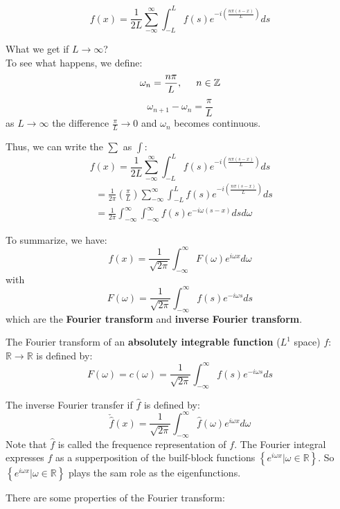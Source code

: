 \documentclass[12pt]{article} %
\begin{document}
$$f(x) = \frac{1}{2L} \sum_{-\infty}^{\infty} \int_{-L}^{L} f(s)e^{-i(\frac{n\pi (s-x)}{L})}ds$$\par
What we get if  $L \to \infty$?\\ 
To see what happens, we define:
$$
\omega_{n} = \frac{n\pi}{L}, \hspace{5mm} n \in \mathbb{Z}
$$
$$
\omega_{n+1}-\omega_{n}=\frac{\pi}{L}
$$as $L \to \infty$ the difference $\frac{\pi}{L} \to 0$ and $\omega_{n}$ becomes continuous.\par
Thus, we can write the $\sum$ as $\int$:
\begin{equation}
f(x) = \frac{1}{2L} \sum_{-\infty}^{\infty} \int_{-L}^{L} f(s)e^{-i(\frac{n\pi (s-x)}{L})}ds
\end{equation}
\begin{align*}
&= \frac{1}{2\pi} \left( \frac{\pi}{L} \right) \sum_{-\infty}^{\infty} \int_{-L}^{L} f(s)e^{-i(\frac{n\pi (s-x)}{L})}ds\\
&=  \frac{1}{2\pi} \int_{-\infty}^{\infty}\int_{-\infty}^{\infty} f(s)e^{-i\omega (s-x)}dsd\omega
\end{align*}\par
To summarize, we have:
\begin{equation}
f(x) = \frac{1}{\sqrt{2\pi}}\int_{-\infty}^{\infty} F(\omega) e^{i\omega x} d\omega
\end{equation}with
\begin{equation}
F(\omega) = \frac{1}{\sqrt{2\pi}}\int_{-\infty}^{\infty} f(s) e^{-i\omega s}ds
\end{equation} which are the \textbf{Fourier transform} and \textbf{inverse Fourier transform}. \par
The Fourier transform of an \textbf{absolutely integrable function} ($L^{1}$ space) $f$: $\mathbb{R} \to \mathbb{R}$ is defined by:
$$
F(\omega) =c(\omega) = \frac{1}{\sqrt{2\pi}}\int_{-\infty}^{\infty} f(s) e^{-i\omega s}ds
$$\par
The inverse Fourier transfer if $\hat{f}$ is defined by:
$$
\check{\hat{f}} (x) = \frac{1}{\sqrt{2\pi}}\int_{-\infty}^{\infty}\hat{f}(\omega)e^{i\omega x} d\omega
$$Note that $\hat{f}$ is called the frequence representation of $f$. The Fourier integral expresses $f$ as a supperposition of the builf-block functions $\left\{ e^{i \omega x} | \omega \in \mathbb{R}  \right\}$. So $\left\{ e^{i \omega x} | \omega \in \mathbb{R}  \right\}$ plays the sam role as the eigenfunctions. \par
There are some properties of the Fourier transform:\\
\end{document}
